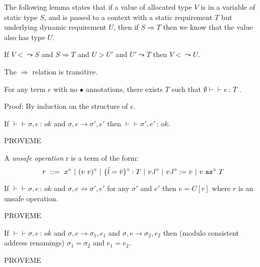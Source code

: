 \documentclass{article}
\newcommand{\safe}{\bullet}
\newcommand{\unsafe}{\circ}
\newcommand{\app}[3]{(#2~#3)^{#1}}
\newcommand{\cast}[3]{#2~\t{as}^{#1}~#3}
\newcommand{\compatible}[2]{#1 \leadsto #2}
\newcommand{\comsubtype}[2]{#1 <\!\!\leadsto #2}
\newcommand{\implies}[2]{#1\Implies #2}
\renewcommand{\t}[1]{{\tt #1}}
\newcommand{\Implies}[0]{\Rightarrow}
\newcommand{\red}[0]{\longrightarrow}  %
\newcommand{\lred}[0]{\red}  %
\newcommand{\judges}[3]{#1\vdash\!\!\!\vdash #2\,:\,#3}
\newcommand{\obje}[3]{\{#2\}^{#1}:{#3}}
\newcommand{\objget}[3]{#2.#3^{#1}}
\newcommand{\objset}[4]{#2.#3^{#1}:=#4}
\begin{document}
The following lemma states that if a value of allocated type $V$ is in a variable of static type $S$,
and is passed to a context with a static requirement $T$ but underlying dynamic requirement $U$,
then if $\implies S T$ then we know that the value also has type $U$.
 
\begin{lemma}
If $\comsubtype V {S}$ and $S\Implies T$ and $U > U'$ and $\compatible {U'} T$ then $\comsubtype V U$.
\end{lemma}

\begin{lemma}
The $\Implies$ relation is transitive. 
\end{lemma}


\begin{lemma}[No Failure]
For any term $e$ with no $\safe$ annotations, there exists $T$ such that
$\judges{\emptyset}{e}{T}$ .
\end{lemma}
Proof: By induction on the structure of $e$.

\begin{lemma}[Preservation]
If $\judges{}{\sigma,e}{ok}$ and $\sigma,e\lred \sigma',e'$ then $\judges{}{\sigma',e'}{ok}$.
\end{lemma}
PROVEME

A \emph{unsafe operation} r is a term of the form:
\[
	r ~::=~ x^\unsafe ~|~ \app{\unsafe}{v}{v} ~|~ \obje{\unsafe}{\bar l = \bar v}{T} ~|~ \objget{\unsafe}{v}{l} ~|~ \objset{\unsafe} v l v
	~|~ \cast{\unsafe} v T
\]
 
\begin{lemma}[Progress]
If $\judges{}{\sigma,e}{ok}$ and $\sigma,e\not\lred \sigma',e'$
for any $\sigma'$ and $e'$ then $e=C[r]$ where $r$ is an unsafe operation. 
\end{lemma}
PROVEME

\begin{lemma}[Determinism]
If $\judges{}{\sigma,e}{ok}$ and $\sigma,e\lred \sigma_1,e_1$ and $\sigma,e\lred \sigma_2,e_2$ then (modulo consistent address renamings) $\sigma_1=\sigma_2$ and $e_1=e_2$.
\end{lemma}
PROVEME
\end{document}
